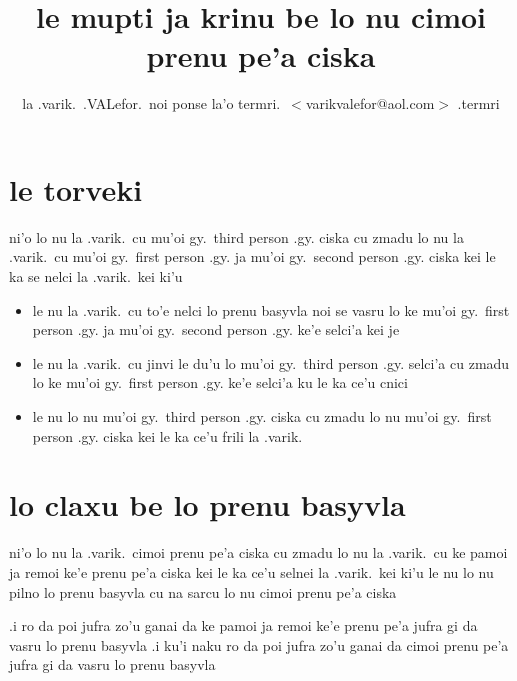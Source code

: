 \documentclass{article}
\title{le mupti ja krinu be lo nu cimoi prenu pe'a ciska}
\author{la .varik.\ .VALefor.\ noi ponse la'o termri.\ $<$varikvalefor@aol.com$>$ .termri}
\begin{document}
\maketitle

\section{le torveki}
ni'o lo nu la .varik.\ cu mu'oi gy.\ third person .gy. ciska cu zmadu lo nu la .varik.\ cu mu'oi gy.\ first person .gy. ja mu'oi gy.\ second person .gy. ciska kei le ka se nelci la .varik.\ kei ki'u
\begin{itemize}
	\item le nu la .varik.\ cu to'e nelci lo prenu basyvla noi se vasru lo ke mu'oi gy.\ first person .gy. ja mu'oi gy.\ second person .gy. ke'e selci'a kei je
	\item le nu la .varik.\ cu jinvi le du'u lo mu'oi gy.\ third person .gy. selci'a cu zmadu lo ke mu'oi gy.\ first person .gy. ke'e selci'a ku le ka ce'u cnici
	\item le nu lo nu mu'oi gy.\ third person .gy. ciska cu zmadu lo nu mu'oi gy.\ first person .gy. ciska kei le ka ce'u frili la .varik.
\end{itemize}

\section{lo claxu be lo prenu basyvla}
ni'o lo nu la .varik.\ cimoi prenu pe'a ciska cu zmadu lo nu la .varik.\ cu ke pamoi ja remoi ke'e prenu pe'a ciska kei le ka ce'u selnei la .varik.\ kei ki'u le nu lo nu pilno lo prenu basyvla cu na sarcu lo nu cimoi prenu pe'a ciska

.i ro da poi jufra zo'u ganai da ke pamoi ja remoi ke'e prenu pe'a jufra gi da vasru lo prenu basyvla  .i ku'i naku ro da poi jufra zo'u ganai da cimoi prenu pe'a jufra gi da vasru lo prenu basyvla
\end{document}
